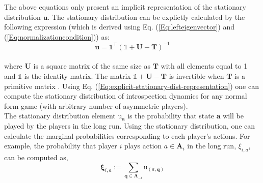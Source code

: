 \documentclass[11pt]{article}
\theoremstyle{plainCl1}
\theoremstyle{plainCl2}
\newcommand{\A}{\mathbf{A}}
\newcommand{\abf}{\mathbf{a}}
\newcommand{\qbf}{\mathbf{q}}
\newcommand{\T}{\mathbf{T}}
\newcommand{\ubf}{\mathbf{u}}
\begin{document}
\noindent The above equations only present an implicit representation of the stationary distribution $\ubf$. The stationary distribution can be explictly calculated by the following expression (which is derived using Eq. (\ref{Eq:lefteigenvector}) and (\ref{Eq:normalizationcondition})) as:
\begin{equation}
\ubf = \mathbf{1}^\intercal (\mathbb{1} + \mathbf{U} - \T)^{-1}
\label{Eq:explicit-stationary-dist-representation}
\end{equation} \\
where $\mathbf{U}$ is a square matrix of the same size as $\T$ with all elements equal to 1 and $\mathbb{1}$ is the identity matrix. The matrix $\mathbb{1} + \mathbf{U} - \T$ is invertible when $\T$ is a primitive matrix \cite{Couto:NJP:2022}. Using Eq. (\ref{Eq:explicit-stationary-dist-representation}) one can compute the stationary distribution of introspection dynamics for any normal form game (with arbitrary number of asymmetric players).\\

\noindent The stationary distribution element $\mathrm{u}_\abf$ is the probability that state $\abf$ will be played by the players in the long run. Using the stationary distribution, one can calculate the marginal probabilities corresponding to each player's actions. For example, the probability that player $i$ plays action $a \in \A_i$ in the long run, $\xi_{i,a}$, can be computed as,
\begin{equation}
\mathbf{\xi}_{i,a} := \sum_{\qbf \in \A_{-i}} \mathrm{u}_{(a, \qbf)}
\label{Eq:marginal-definition}
\end{equation}
\end{document}
